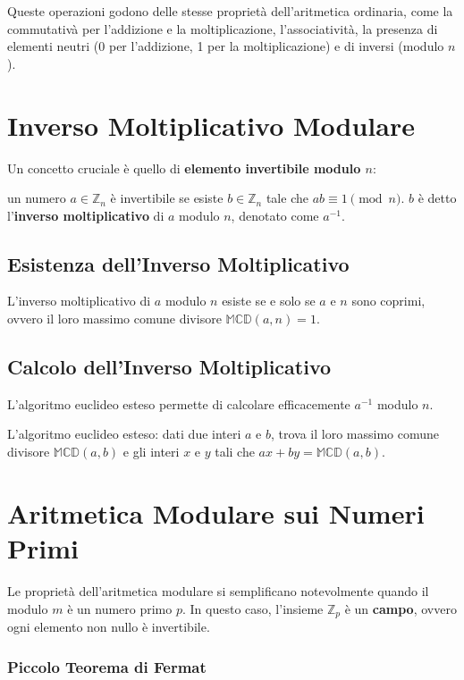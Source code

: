 \documentclass[a4paper,12pt]{report}
\begin{document}
Queste operazioni godono delle stesse proprietà dell'aritmetica ordinaria, come la commutativà per l'addizione e la moltiplicazione, l'associatività, la presenza di elementi neutri (0 per l'addizione, 1 per la moltiplicazione) e di inversi (modulo $n$).

\section{Inverso Moltiplicativo Modulare}

Un concetto cruciale è quello di \textbf{elemento invertibile modulo $n$}: 

un numero $a \in \mathbb{Z}_n$ è invertibile se esiste $b \in \mathbb{Z}_n$ tale che $ab \equiv 1 \pmod{n}$. $b$ è detto l'\textbf{inverso moltiplicativo} di $a$ modulo $n$, denotato come $a^{-1}$.

\subsection*{Esistenza dell'Inverso Moltiplicativo}
L'inverso moltiplicativo di $a$ modulo $n$ esiste se e solo se $a$ e $n$ sono coprimi, ovvero il loro massimo comune divisore $\mathbb{MCD}(a,n) = 1$. 

\subsection*{Calcolo dell'Inverso Moltiplicativo}
L'algoritmo euclideo esteso permette di calcolare efficacemente $a^{-1}$ modulo $n$.

L'algoritmo euclideo esteso: dati due interi $a$ e $b$, trova il loro massimo comune divisore $\mathbb{MCD}(a,b)$ e gli interi $x$ e $y$ tali che $ax + by = \mathbb{MCD}(a,b)$.

\section{Aritmetica Modulare sui Numeri Primi}

Le proprietà dell'aritmetica modulare si semplificano notevolmente quando il modulo $m$ è un numero primo $p$. In questo caso, l'insieme $\mathbb{Z}_p$ è un \textbf{campo}, ovvero ogni elemento non nullo è invertibile.

\subsubsection*{Piccolo Teorema di Fermat}
\end{document}
